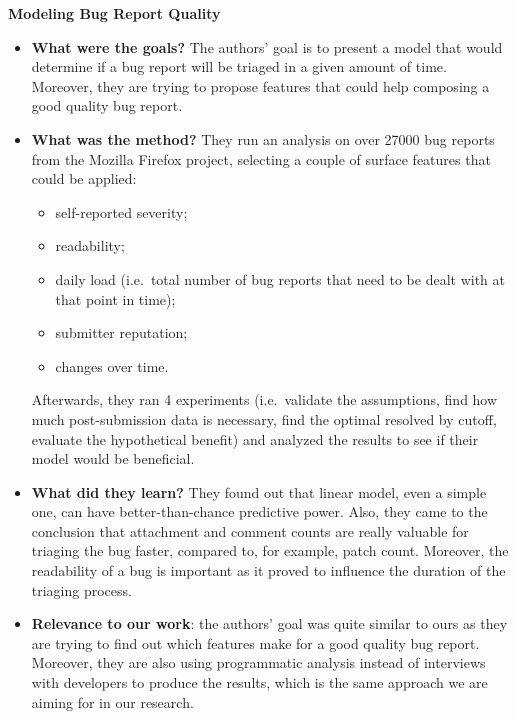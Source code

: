\documentclass{mprop}
\begin{document}
\textbf{Modeling Bug Report Quality}\cite{hooimeijer2007modeling}
\begin{itemize}
  \item \textbf{What were the goals?}
    The authors' goal is to present a model that would determine if a bug
    report will be triaged in a given amount of time. Moreover, they are 
    trying to propose features that could help composing a good quality
    bug report.
  \item \textbf{What was the method?}
    They run an analysis on over 27000 bug reports from the Mozilla Firefox
    project, selecting a couple of surface features that could be applied:
      \begin{itemize}
        \item self-reported severity;
        \item readability;
        \item daily load (i.e.\ total number of bug reports that need to be
          dealt with at that point in time);
        \item submitter reputation;
        \item changes over time.
      \end{itemize}
    Afterwards, they ran 4 experiments (i.e.\ validate the assumptions, find
    how much post-submission data is necessary, find the optimal resolved by
    cutoff, evaluate the hypothetical benefit) and analyzed the results to
    see if their model would be beneficial.
  \item \textbf{What did they learn?}
    They found out that linear model, even a simple one, can have 
    better-than-chance predictive power. Also, they came to the conclusion that 
    attachment and comment counts are really valuable for triaging the bug faster,
    compared to, for example, patch count. Moreover, the readability of a bug is
    important as it proved to influence the duration of the triaging process. 
  \item \textbf{Relevance to our work}: the authors' goal was quite similar to ours
    as they are trying to find out which features make for a good quality bug 
    report. Moreover, they are also using programmatic analysis instead of
    interviews with developers to produce the results, which is the same approach
    we are aiming for in our research.
\end{itemize}
\end{document}

